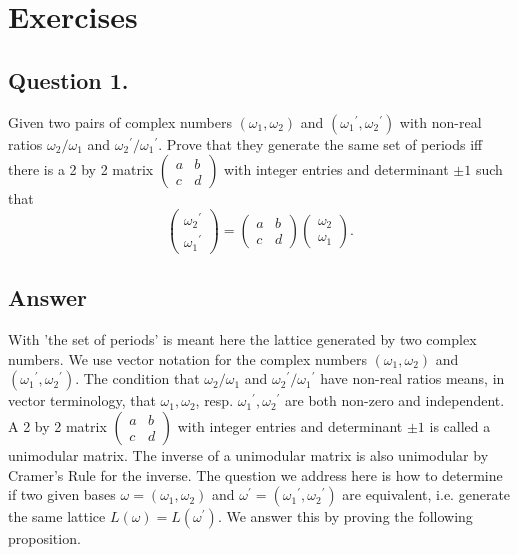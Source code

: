\section{Exercises}

\subsection{Question 1.}
\noindent
Given two pairs of complex numbers $(\omega_1, \omega_2)$ and $({\omega_1}^\prime, {\omega_2}^\prime)$ with non-real
ratios $\omega_2 / \omega_1$ and ${\omega_2}^\prime / {\omega_1}^\prime$. Prove that they generate the same set of
periods iff there is a 2 by 2 matrix $\begin{pmatrix} a & b \\ c & d \end{pmatrix}$ with integer entries and
determinant $\pm 1$ such that \[
\begin{pmatrix} {\omega_2}^\prime \\ {\omega_1}^\prime \end{pmatrix} =
\begin{pmatrix} a & b \\ c & d \end{pmatrix} \begin{pmatrix} \omega_2 \\ \omega_1 \end{pmatrix}.
\]

\subsection*{Answer}
\noindent
With 'the set of periods' is meant here the lattice generated by two complex numbers.
We use vector notation for the complex numbers $(\omega_1, \omega_2)$ and $({\omega_1}^\prime, {\omega_2}^\prime)$.
The condition that $\omega_2 / \omega_1$ and ${\omega_2}^\prime / {\omega_1}^\prime$ have non-real ratios means,
in vector terminology, that $\omega_1, \omega_2$, resp. ${\omega_1}^\prime, {\omega_2}^\prime$ are both
non-zero and independent.
A 2 by 2 matrix $\begin{pmatrix} a & b \\ c & d \end{pmatrix}$ with integer entries and determinant $\pm 1$ is called
a unimodular matrix. The inverse of a unimodular matrix is also unimodular by Cramer's Rule for the inverse.
The question we address here is how to determine if two given bases $\omega = (\omega_1, \omega_2)$ and
$\omega^\prime = ({\omega_1}^\prime, {\omega_2}^\prime)$ are equivalent, i.e. generate the same lattice
$L(\omega)=L(\omega^\prime)$.
We answer this by proving the following proposition.

